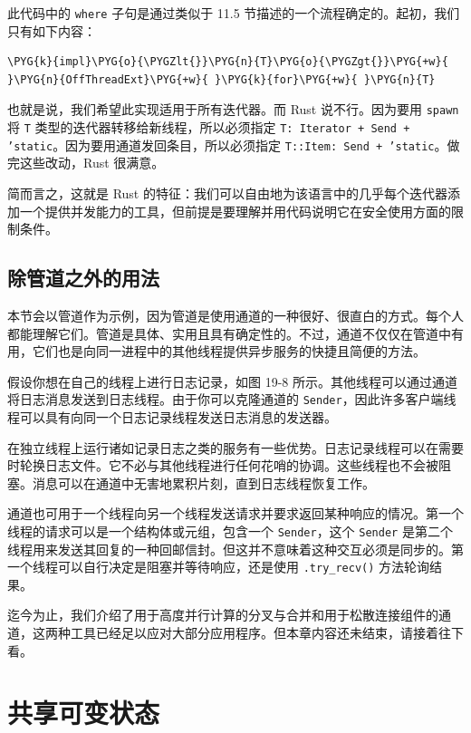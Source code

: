 此代码中的 \texttt{where} 子句是通过类似于 11.5 节描述的一个流程确定的。起初，我们只有如下内容：

\begin{Verbatim}[commandchars=\\\{\},breaklines=true,breakanywhere=true,fontsize=\codefont,xleftmargin=17bp]
\PYG{k}{impl}\PYG{o}{\PYGZlt{}}\PYG{n}{T}\PYG{o}{\PYGZgt{}}\PYG{+w}{ }\PYG{n}{OffThreadExt}\PYG{+w}{ }\PYG{k}{for}\PYG{+w}{ }\PYG{n}{T}
\end{Verbatim}

也就是说，我们希望此实现适用于所有迭代器。而 Rust 说不行。因为要用 \texttt{spawn} 将 \texttt{T} 类型的迭代器转移给新线程，所以必须指定 \texttt{T: Iterator + Send + 'static}。因为要用通道发回条目，所以必须指定 \texttt{T::Item: Send + 'static}。做完这些改动，Rust 很满意。

简而言之，这就是 Rust 的特征：我们可以自由地为该语言中的几乎每个迭代器添加一个提供并发能力的工具，但前提是要理解并用代码说明它在安全使用方面的限制条件。

\subsection{除管道之外的用法}

本节会以管道作为示例，因为管道是使用通道的一种很好、很直白的方式。每个人都能理解它们。管道是具体、实用且具有确定性的。不过，通道不仅仅在管道中有用，它们也是向同一进程中的其他线程提供异步服务的快捷且简便的方法。

假设你想在自己的线程上进行日志记录，如图 19-8 所示。其他线程可以通过通道将日志消息发送到日志线程。由于你可以克隆通道的 \texttt{Sender}，因此许多客户端线程可以具有向同一个日志记录线程发送日志消息的发送器。

在独立线程上运行诸如记录日志之类的服务有一些优势。日志记录线程可以在需要时轮换日志文件。它不必与其他线程进行任何花哨的协调。这些线程也不会被阻塞。消息可以在通道中无害地累积片刻，直到日志线程恢复工作。

通道也可用于一个线程向另一个线程发送请求并要求返回某种响应的情况。第一个线程的请求可以是一个结构体或元组，包含一个 \texttt{Sender}，这个 \texttt{Sender} 是第二个线程用来发送其回复的一种回邮信封。但这并不意味着这种交互必须是同步的。第一个线程可以自行决定是阻塞并等待响应，还是使用 \texttt{.try\_recv()} 方法轮询结果。

迄今为止，我们介绍了用于高度并行计算的分叉与合并和用于松散连接组件的通道，这两种工具已经足以应对大部分应用程序。但本章内容还未结束，请接着往下看。

\section{共享可变状态}

